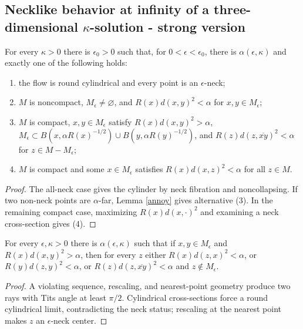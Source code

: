 \subsection{Necklike behavior at infinity of a three-dimensional $\kappa$-solution - strong version}
\label{strongversion}
\begin{corollary}
\label{cor:kl-necklike-behavior-at-infinity-three-dimensional-solution-strong-version-existence-kappa-solutions}

\label{neckstructure}
For every $\kappa>0$ there is $\epsilon_0>0$ such that, for
$0<\epsilon<\epsilon_0$, there is $\alpha(\epsilon,\kappa)$ and exactly one
of the following holds:
\begin{enumerate}
\item the flow is round cylindrical and every point is an $\epsilon$-neck;
\item $M$ is noncompact, $M_\epsilon\ne\varnothing$, and
$R(x)d(x,y)^2<\alpha$ for $x,y\in M_\epsilon$;
\item $M$ is compact, $x,y\in M_\epsilon$ satisfy $R(x)d(x,y)^2>\alpha$,
$M_\epsilon\subset B(x,\alpha R(x)^{-1/2})\cup
B(y,\alpha R(y)^{-1/2})$, and
$R(z)d(z,\overline{xy})^2<\alpha$ for $z\in M-M_\epsilon$;
\item $M$ is compact and some $x\in M_\epsilon$ satisfies
$R(x)d(x,z)^2<\alpha$ for all $z\in M$.
\end{enumerate}
\end{corollary}
\begin{proof}
\sketch The all-neck case gives the cylinder by neck fibration and
noncollapsing.  If two non-neck points are $\alpha$-far, Lemma
\ref{annoy} gives alternative (3).  In the remaining compact case,
maximizing $R(x)d(x,\cdot)^2$ and examining a neck cross-section gives (4).
\end{proof}
\begin{lemma}
\label{lem:kl-necklike-behavior-at-infinity-three-dimensional-solution-strong-version-existence-kappa-solutions}

\label{annoy}
For every $\epsilon,\kappa>0$ there is $\alpha(\epsilon,\kappa)$ such that if
$x,y\in M_\epsilon$ and $R(x)d(x,y)^2>\alpha$, then for every $z$ either
$R(x)d(z,x)^2<\alpha$, or $R(y)d(z,y)^2<\alpha$, or
$R(z)d(z,\overline{xy})^2<\alpha$ and $z\notin M_\epsilon$.
\end{lemma}
\begin{proof}
\sketch A violating sequence, rescaling, and nearest-point geometry produce
two rays with Tits angle at least $\pi/2$.  Cylindrical cross-sections force a
round cylindrical limit, contradicting the neck status; rescaling at the
nearest point makes $z$ an $\epsilon$-neck center.
\end{proof}
